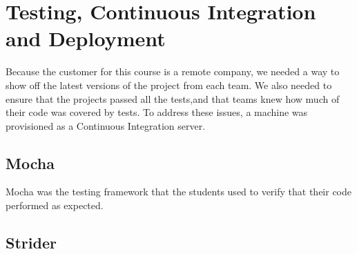 \documentclass[12pt]{article}
\begin{document}
\section{Testing, Continuous Integration and Deployment}\label{sec:CI}
Because the customer for this course is a remote company, we needed a way to show off the latest versions of the project from each team. We also needed to ensure that the projects passed all the tests,and that teams knew how much of their code was covered by tests. To address these issues, a machine was provisioned as a Continuous Integration server. 

\subsection{Mocha}\label{sec:mocha}
Mocha was the testing framework that the students used to verify that their code performed as expected. 


\subsection{Strider}\label{sec:strider}





%
%




%  
%
%


\end{document}
